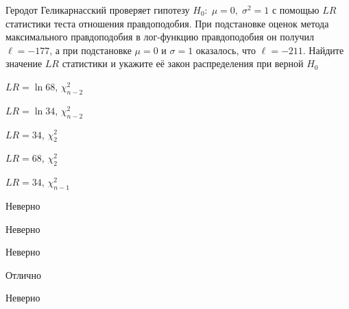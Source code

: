 
\begin{question}
Геродот Геликарнасский проверяет гипотезу
\(H_0: \; \mu=0, \; \sigma^2=1\) с помощью \(LR\) статистики теста
отношения правдоподобия. При подстановке оценок метода максимального
правдоподобия в лог-функцию правдоподобия он получил \(\ell=-177\), а
при подстановке \(\mu=0\) и \(\sigma=1\) оказалось, что \(\ell=-211\).
Найдите значение \(LR\) статистики и укажите её закон распределения при
верной \(H_0\)
\begin{answerlist}
  \item \(LR=\ln 68\), \(\chi^2_{n-2}\)
  \item \(LR=\ln 34\), \(\chi^2_{n-2}\)
  \item \(LR=34\), \(\chi^2_2\)
  \item \(LR=68\), \(\chi^2_2\)
  \item \(LR=34\), \(\chi^2_{n-1}\)
\end{answerlist}
\end{question}

\begin{solution}
\begin{answerlist}
  \item Неверно
  \item Неверно
  \item Неверно
  \item Отлично
  \item Неверно
\end{answerlist}
\end{solution}

